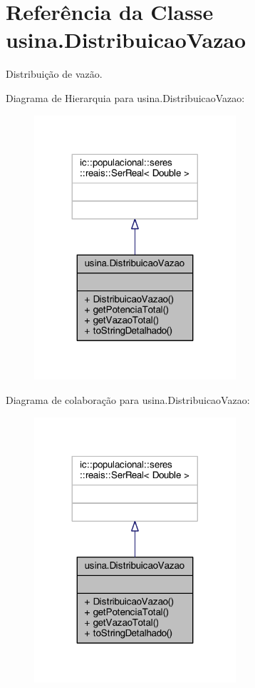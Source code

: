 \hypertarget{classusina_1_1_distribuicao_vazao}{\section{Referência da Classe usina.\-Distribuicao\-Vazao}
\label{classusina_1_1_distribuicao_vazao}
}


Distribuição de vazão.  




Diagrama de Hierarquia para usina.\-Distribuicao\-Vazao\-:
\nopagebreak
\begin{figure}[H]
\begin{center}
\leavevmode
\includegraphics[width=212pt]{classusina_1_1_distribuicao_vazao__inherit__graph}
\end{center}
\end{figure}


Diagrama de colaboração para usina.\-Distribuicao\-Vazao\-:
\nopagebreak
\begin{figure}[H]
\begin{center}
\leavevmode
\includegraphics[width=212pt]{classusina_1_1_distribuicao_vazao__coll__graph}
\end{center}
\end{figure}
